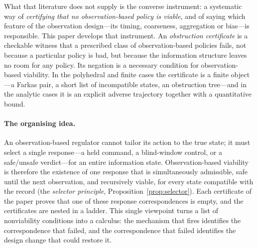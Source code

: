 \documentclass[11pt,a4paper]{article}
\theoremstyle{plain}
\theoremstyle{definition}
\theoremstyle{remark}
\begin{document}
What that literature does not supply is the converse instrument: a systematic way of \emph{certifying that no observation-based policy is viable}, and of saying which feature of the observation design---its timing, coarseness, aggregation or bias---is responsible. This paper develops that instrument. An \emph{obstruction certificate} is a checkable witness that a prescribed class of observation-based policies fails, not because a particular policy is bad, but because the information structure leaves no room for any policy. Its negation is a necessary condition for observation-based viability. In the polyhedral and finite cases the certificate is a finite object---a Farkas pair, a short list of incompatible states, an obstruction tree---and in the analytic cases it is an explicit adverse trajectory together with a quantitative bound.

\paragraph{The organising idea.} An observation-based regulator cannot tailor its action to the true state; it must select a single response---a held command, a blind-window control, or a safe/unsafe verdict---for an entire information state. Observation-based viability is therefore the existence of one response that is simultaneously admissible, safe until the next observation, and recursively viable, for every state compatible with the record (the \emph{selector principle}, Proposition~\ref{prop:selector}). Each certificate of the paper proves that one of these response correspondences is empty, and the certificates are nested in a ladder. This single viewpoint turns a list of nonviability conditions into a calculus: the mechanism that fires identifies the correspondence that failed, and the correspondence that failed identifies the design change that could restore it.
\end{document}
